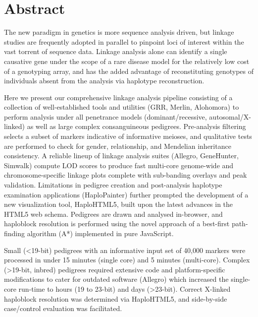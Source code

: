 \chapter*{Abstract}

\vspace{15pt}
\begin{spacing}{1.4}
The new paradigm in genetics is more sequence analysis driven, but linkage studies are frequently adopted in parallel to pinpoint loci of interest within the vast torrent of sequence data. Linkage analysis alone can identify a single causative gene under the scope of a rare disease model for the relatively low cost of a genotyping array, and has the added advantage of reconstituting genotypes of individuals absent from the analysis via haplotype reconstruction.

Here we present our comprehensive linkage analysis pipeline consisting of a collection of well-established tools and utilities (GRR, Merlin, Alohomora) to perform analysis under all penetrance models (dominant/recessive, autosomal/X-linked) as well as large complex consanguineous pedigrees. Pre-analysis filtering selects a subset of markers indicative of informative meioses, and qualitative tests are performed to check for gender, relationship, and Mendelian inheritance consistency. A reliable lineup of linkage analysis suites (Allegro, GeneHunter, Simwalk) compute LOD scores to produce fast multi-core genome-wide and chromosome-specific linkage plots complete with sub-banding overlays and peak validation. Limitations in pedigree creation and post-analysis haplotype examination applications (HaploPainter) further prompted the development of a new  visualization tool,  HaploHTML5,  built upon the latest advances in the HTML5 web schema. Pedigrees are drawn and analysed in-browser, and haploblock resolution is performed using the novel approach of a best-first path-finding algorithm (A*) implemented in pure JavaScript.

Small (<19-bit) pedigrees with an informative input set of 40,000 markers were processed in under 15 minutes (single core) and 5 minutes (multi-core). Complex (>19-bit, inbred) pedigrees required extensive code and platform-specific modifications to cater for outdated software (Allegro) which increased the single-core run-time to hours (19 to 23-bit) and days (>23-bit). Correct X-linked haploblock resolution was determined via HaploHTML5, and side-by-side case/control evaluation was facilitated.
\end{spacing}